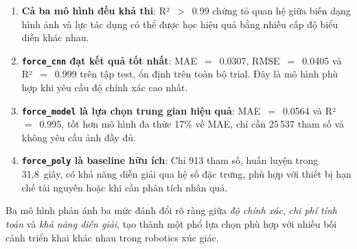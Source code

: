 \begin{enumerate}
  \item \textbf{Cả ba mô hình đều khả thi}: R²~$>$~0.99 chứng tỏ quan hệ
        giữa biến dạng hình ảnh và lực tác dụng có thể được học hiệu quả bằng
        nhiều cấp độ biểu diễn khác nhau.

  \item \textbf{\texttt{force\_cnn} đạt kết quả tốt nhất}: MAE~$=$~0.0307,
        RMSE~$=$~0.0405 và R²~$=$~0.999 trên tập test, ổn định trên toàn bộ
        trial. Đây là mô hình phù hợp khi yêu cầu độ chính xác cao nhất.

  \item \textbf{\texttt{force\_model} là lựa chọn trung gian hiệu quả}:
        MAE~$=$~0.0564 và R²~$=$~0.995, tốt hơn mô hình đa thức 17\% về MAE,
        chỉ cần 25\,537 tham số và không yêu cầu ảnh đầy đủ.

  \item \textbf{\texttt{force\_poly} là baseline hữu ích}: Chỉ 913 tham số,
        huấn luyện trong 31,8~giây, có khả năng diễn giải qua hệ số đặc trưng,
        phù hợp với thiết bị hạn chế tài nguyên hoặc khi cần phân tích nhân
        quả.
\end{enumerate}

Ba mô hình phản ánh ba mức đánh đổi rõ ràng giữa \emph{độ chính xác},
\emph{chi phí tính toán} và \emph{khả năng diễn giải}, tạo thành một phổ
lựa chọn phù hợp với nhiều bối cảnh triển khai khác nhau trong robotics xúc
giác.
